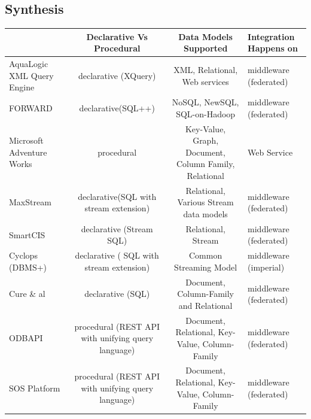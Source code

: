 \subsection{Synthesis}
 
 \begin{tabulary}{\linewidth}{ | L | C | C | L | }
\hline
	 & Declarative Vs Procedural & Data Models Supported & Integration Happens on \\ \hline
	AquaLogic XML Query Engine & declarative (XQuery) & XML, Relational, Web services & middleware (federated) \\ \hline
	FORWARD & declarative(SQL++) & NoSQL, NewSQL, SQL-on-Hadoop & middleware (federated) \\ 
\hline
	Microsoft Adventure Works & procedural & Key-Value, Graph, Document, Column Family, Relational & Web Service \\ \hline
	MaxStream & declarative(SQL with stream extension) & Relational, Various Stream data models & middleware (federated) \\ \hline
	SmartCIS & declarative (Stream SQL) & Relational, Stream & middleware (federated) \\ \hline
	Cyclops (DBMS+) & declarative ( SQL with stream extension) & Common Streaming Model & middleware (imperial) \\ \hline
	Cure \& al & declarative (SQL) & Document, Column-Family and Relational & middleware (federated) \\ \hline
	ODBAPI & procedural (REST API with unifying query language) & Document, Relational, Key-Value, Column-Family & middleware (federated) \\ \hline
	SOS Platform & procedural (REST API with unifying query language) & Document, Relational, Key-Value, Column-Family & middleware (federated) \\ \hline
\end{tabulary}




